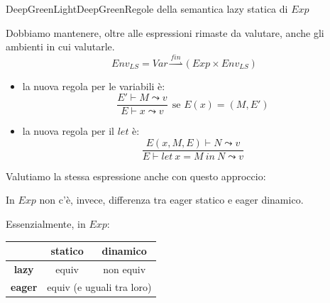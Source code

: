 \documentclass[a4paper,11pt]{report}
\newcommand{\farrow}{\overset{fin}{\rightharpoonup}}
\begin{document}
\begin{cdefframe}{DeepGreenLight}{DeepGreen}{Regole della semantica lazy statica di \(Exp\)}{}

    Dobbiamo mantenere, oltre alle espressioni rimaste da valutare, anche gli ambienti in cui valutarle.
\[ Env_{LS} = Var \farrow (Exp \times Env_{LS}) \]

   \begin{itemize}

\item la nuova regola per le variabili è:
    \[ \frac{E'\vdash M \leadsto v}{E\vdash x \leadsto v} \ \ \text{se } E(x)=(M, E')\]

\item la nuova regola per il \( let \) è:
    \[ \frac{E(x, M, E)\vdash N \leadsto v}{E \vdash let \ x = M \ in \ N \leadsto v} \]

   \end{itemize}
\end{cdefframe}

Valutiamo la stessa espressione anche con questo approccio:

\begin{prooftree}
\end{prooftree}

In \( Exp \) non c'è, invece, differenza tra eager statico e eager dinamico.

\begin{gframe}{}
   Essenzialmente, in \( Exp \):
   \vspace{-1em}
\begin{center}
\begin{tabular}{c|c|c}
     & \textbf{statico} & \textbf{dinamico} \\ \hline
\textbf{lazy} & equiv & non equiv \\ \hline
\textbf{eager}& \multicolumn{2}{c}{equiv (e uguali tra loro)} \\
\end{tabular}
\end{center} 
\end{gframe}
\end{document}
